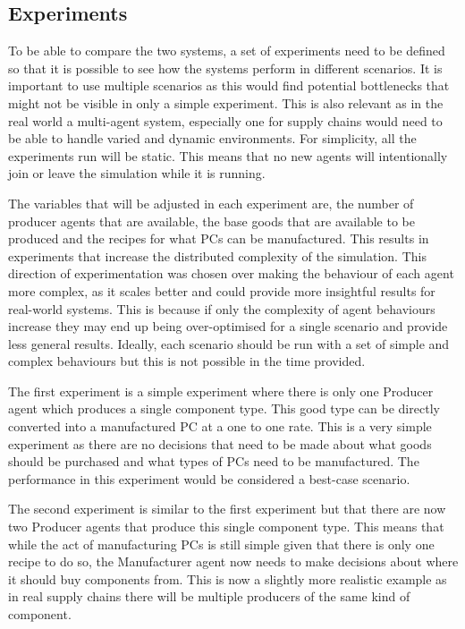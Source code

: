 \subsection{Experiments}

To be able to compare the two systems, a set of experiments need to be defined so that it is possible to see how the systems perform in different scenarios.
It is important to use multiple scenarios as this would find potential bottlenecks that might not be visible in only a simple experiment.
This is also relevant as in the real world a multi-agent system, especially one for supply chains would need to be able to handle varied and dynamic environments.
For simplicity, all the experiments run will be static.
This means that no new agents will intentionally join or leave the simulation while it is running.

The variables that will be adjusted in each experiment are, the number of producer agents that are available, the base goods that are available to be produced and the recipes for what PCs can be manufactured.
This results in experiments that increase the distributed complexity of the simulation.
This direction of experimentation was chosen over making the behaviour of each agent more complex, as it scales better and could provide more insightful results for real-world systems.
This is because if only the complexity of agent behaviours increase they may end up being over-optimised for a single scenario and provide less general results.
Ideally, each scenario should be run with a set of simple and complex behaviours but this is not possible in the time provided.

The first experiment is a simple experiment where there is only one Producer agent which produces a single component type.
This good type can be directly converted into a manufactured PC at a one to one rate.
This is a very simple experiment as there are no decisions that need to be made about what goods should be purchased and what types of PCs need to be manufactured.
The performance in this experiment would be considered a best-case scenario.

The second experiment is similar to the first experiment but that there are now two Producer agents that produce this single component type.
This means that while the act of manufacturing PCs is still simple given that there is only one recipe to do so, the Manufacturer agent now needs to make decisions about where it should buy components from.
This is now a slightly more realistic example as in real supply chains there will be multiple producers of the same kind of component.

